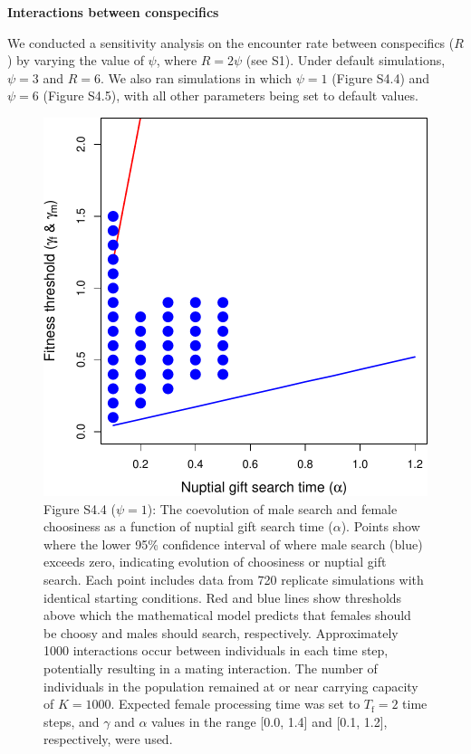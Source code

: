 \documentclass[
]{article}
\begin{document}
\textbf{Interactions between conspecifics}

We conducted a sensitivity analysis on the encounter rate between
conspecifics (\(R\)) by varying the value of \(\psi\), where
\(R = 2\psi\) (see S1). Under default simulations, \(\psi = 3\) and
\(R = 6\). We also ran simulations in which \(\psi = 1\) (Figure S4.4)
and \(\psi = 6\) (Figure S4.5), with all other parameters being set to
default values.

\captionsetup{labelformat=empty}

\begin{figure}
\centering
\includegraphics{ms_refs_fixed_files/figure-latex/unnamed-chunk-9-1.pdf}
\caption{Figure S4.4 (\(\psi = 1\)): The coevolution of male search and
female choosiness as a function of nuptial gift search time
(\(\alpha\)). Points show where the lower 95\% confidence interval of
where male search (blue) exceeds zero, indicating evolution of
choosiness or nuptial gift search. Each point includes data from 720
replicate simulations with identical starting conditions. Red and blue
lines show thresholds above which the mathematical model predicts that
females should be choosy and males should search, respectively.
Approximately 1000 interactions occur between individuals in each time
step, potentially resulting in a mating interaction. The number of
individuals in the population remained at or near carrying capacity of
\(K = 1000\). Expected female processing time was set to
\(T_{\mathrm{f}}=2\) time steps, and \(\gamma\) and \(\alpha\) values in
the range {[}0.0, 1.4{]} and {[}0.1, 1.2{]}, respectively, were used.}
\end{figure}
\end{document}

